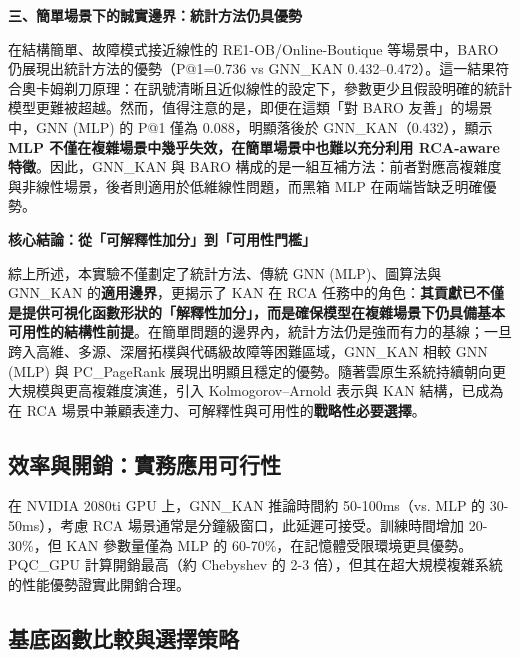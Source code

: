 \documentclass[10pt,a4paper,twocolumn]{article}
\begin{document}
\textbf{三、簡單場景下的誠實邊界：統計方法仍具優勢}

在結構簡單、故障模式接近線性的 RE1-OB/Online-Boutique 等場景中，BARO 仍展現出統計方法的優勢（P@1=0.736 vs GNN\_KAN 0.432–0.472）。這一結果符合奧卡姆剃刀原理：在訊號清晰且近似線性的設定下，參數更少且假設明確的統計模型更難被超越。然而，值得注意的是，即便在這類「對 BARO 友善」的場景中，GNN (MLP) 的 P@1 僅為 0.088，明顯落後於 GNN\_KAN（0.432），顯示\textbf{MLP 不僅在複雜場景中幾乎失效，在簡單場景中也難以充分利用 RCA-aware 特徵}。因此，GNN\_KAN 與 BARO 構成的是一組互補方法：前者對應高複雜度與非線性場景，後者則適用於低維線性問題，而黑箱 MLP 在兩端皆缺乏明確優勢。

\textbf{核心結論：從「可解釋性加分」到「可用性門檻」}

綜上所述，本實驗不僅劃定了統計方法、傳統 GNN (MLP)、圖算法與 GNN\_KAN 的\textbf{適用邊界}，更揭示了 KAN 在 RCA 任務中的角色：\textbf{其貢獻已不僅是提供可視化函數形狀的「解釋性加分」，而是確保模型在複雜場景下仍具備基本可用性的結構性前提}。在簡單問題的邊界內，統計方法仍是強而有力的基線；一旦跨入高維、多源、深層拓樸與代碼級故障等困難區域，GNN\_KAN 相較 GNN (MLP) 與 PC\_PageRank 展現出明顯且穩定的優勢。隨著雲原生系統持續朝向更大規模與更高複雜度演進，引入 Kolmogorov–Arnold 表示與 KAN 結構，已成為在 RCA 場景中兼顧表達力、可解釋性與可用性的\textbf{戰略性必要選擇}。

\subsection{效率與開銷：實務應用可行性}

在 NVIDIA 2080ti GPU 上，GNN\_KAN 推論時間約 50-100ms（vs. MLP 的 30-50ms），考慮 RCA 場景通常是分鐘級窗口，此延遲可接受。訓練時間增加 20-30\%，但 KAN 參數量僅為 MLP 的 60-70\%，在記憶體受限環境更具優勢。PQC\_GPU 計算開銷最高（約 Chebyshev 的 2-3 倍），但其在超大規模複雜系統的性能優勢證實此開銷合理。

\subsection{基底函數比較與選擇策略}
\end{document}
